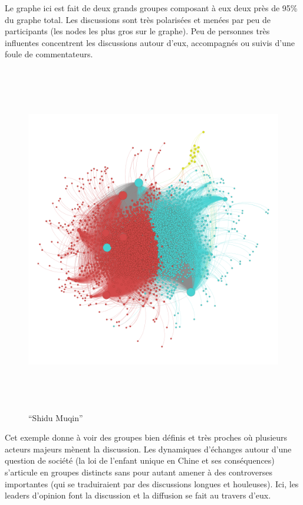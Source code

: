 Le graphe ici est fait de deux grands groupes composant \`a eux deux
pr\`es de 95\% du graphe total. Les discussions sont tr\`es
polaris\'ees et men\'ees par peu de participants (les nodes les plus
gros sur le graphe). Peu de personnes tr\`es influentes concentrent les
discussions autour d{\textquoteright}eux, accompagn\'es ou suivis
d{\textquoteright}une foule de commentateurs. 

\begin{figure}[th]
    \centering
    \includegraphics[width=6.0114in,height=6.0114in]{figures/chap3/chapitre3-img18.png}
    \caption{{\textquotedblleft}Shidu Muqin{\textquotedblright}}
\end{figure}


Cet exemple donne \`a voir des groupes bien d\'efinis et tr\`es proches
o\`u plusieurs acteurs majeurs m\`enent la discussion. Les dynamiques
d{\textquoteright}\'echanges autour d{\textquoteright}une question de
soci\'et\'e (la loi de l{\textquoteright}enfant unique en Chine et ses
cons\'equences) s{\textquoteright}articule en groupes distincts sans
pour autant amener \`a des controverses importantes (qui se
traduiraient par des discussions longues et houleuses). Ici, les
leaders d{\textquoteright}opinion font la discussion et la diffusion se
fait au travers d{\textquoteright}eux.

